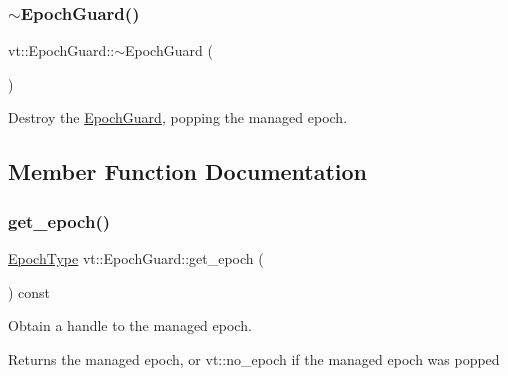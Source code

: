\mbox{\label{structvt_1_1_epoch_guard_adf6677491e5d70a81645216b3cb65d0a}} 
\subsubsection{\texorpdfstring{$\sim$\+Epoch\+Guard()}{~EpochGuard()}}
{\footnotesize\ttfamily vt\+::\+Epoch\+Guard\+::$\sim$\+Epoch\+Guard (\begin{DoxyParamCaption}{ }\end{DoxyParamCaption})}



Destroy the \hyperlink{structvt_1_1_epoch_guard}{Epoch\+Guard}, popping the managed epoch. 



\subsection{Member Function Documentation}
\mbox{\label{structvt_1_1_epoch_guard_a41d2d7190be38fe256d6d8476a1f460e}} 
\subsubsection{\texorpdfstring{get\+\_\+epoch()}{get\_epoch()}}
{\footnotesize\ttfamily \hyperlink{namespacevt_a81d11b28122d43bf9834577e4a06440f}{Epoch\+Type} vt\+::\+Epoch\+Guard\+::get\+\_\+epoch (\begin{DoxyParamCaption}{ }\end{DoxyParamCaption}) const\hspace{0.3cm}{\ttfamily [noexcept]}}



Obtain a handle to the managed epoch. 

\begin{DoxyReturn}{Returns}
the managed epoch, or vt\+::no\+\_\+epoch if the managed epoch was popped 
\end{DoxyReturn}
\mbox{\label{structvt_1_1_epoch_guard_adc52bcc301ca61c7cf3d52c725345ee6}} 
